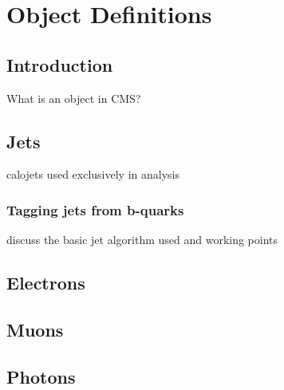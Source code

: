 \chapter{Object Definitions}

\ifpdf
    \graphicspath{{Chapter4/Figs/Raster/}{Chapter4/Figs/PDF/}{Chapter4/Figs/}}
\else
    \graphicspath{{Chapter4/Figs/Vector/}{Chapter4/Figs/}}
\fi


\section{Introduction}  %
\label{sec:objects_introduction}
What is an object in CMS?


\section{Jets}  %
\label{sec:objects_jets}
calojets used exclusively in analysis

\subsection{Tagging jets from b-quarks}
discuss the basic jet algorithm used and working points

\section{Electrons}  %
\label{sec:objects_electrons}


\section{Muons}  %
\label{sec:objects_muons}


\section{Photons}  %
\label{sec:objects_photons}


